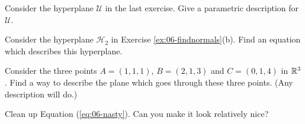 \documentclass[elementsmain.tex]{subfiles}
\begin{document}
\begin{exercise}
Consider the hyperplane $\mathcal{U}$ in the last exercise. Give a parametric description for $\mathcal{U}$.
\end{exercise}

\begin{exercise}
Consider the hyperplane $\mathcal{H}_2$ in Exercise \ref{ex:06-findnormals}(b). Find an equation which describes this hyperplane.
\end{exercise}

\begin{exercise}
Consider the three points $A = (1,1,1)$, $B=(2,1,3)$ and $C=(0,1,4)$ in $\mathbb{R}^3$. Find a way to describe the plane which goes through these three points. (Any description will do.)
\end{exercise}

\begin{exercise}
Clean up Equation (\ref{eq:06-nasty}). Can you make it look relatively nice?
\end{exercise}

\clearpage
\end{document}
